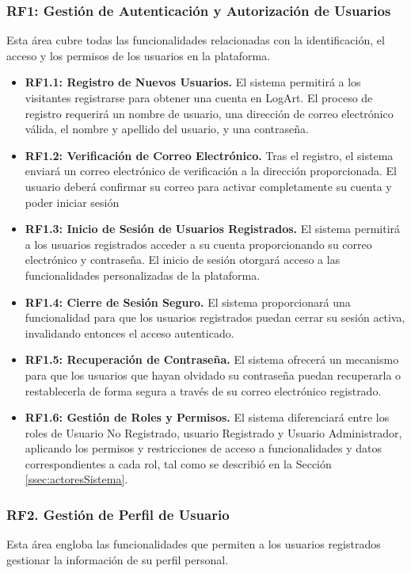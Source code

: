\subsubsection{RF1: Gestión de Autenticación y Autorización de Usuarios}
\label{rf:autenticacion}
Esta área cubre todas las funcionalidades relacionadas con la identificación, el acceso y los permisos de los usuarios en la plataforma.
\begin{itemize}
    \item \textbf{RF1.1: Registro de Nuevos Usuarios.} El sistema permitirá a los visitantes registrarse para obtener una cuenta en LogArt. El proceso de registro requerirá un nombre de usuario, una dirección de correo electrónico válida, el nombre y apellido del usuario, y una contraseña.
    \item \textbf{RF1.2: Verificación de Correo Electrónico.} Tras el registro, el sistema enviará un correo electrónico de verificación a la dirección proporcionada. El usuario deberá confirmar su correo para activar completamente su cuenta y poder iniciar sesión
    \item \textbf{RF1.3: Inicio de Sesión de Usuarios Registrados.} El sistema permitirá a los usuarios registrados acceder a su cuenta proporcionando su correo electrónico y contraseña. El inicio de sesión otorgará acceso a las funcionalidades personalizadas de la plataforma.
    \item \textbf{RF1.4: Cierre de Sesión Seguro.} El sistema proporcionará una funcionalidad para que los usuarios registrados puedan cerrar su sesión activa, invalidando entonces el acceso autenticado.
    \item \textbf{RF1.5: Recuperación de Contraseña.} El sistema ofrecerá un mecanismo para que los usuarios que hayan olvidado su contraseña puedan recuperarla o restablecerla de forma segura a través de su correo electrónico registrado.
    \item \textbf{RF1.6: Gestión de Roles y Permisos.} El sistema diferenciará entre los roles de Usuario No Registrado, usuario Registrado y Usuario Administrador, aplicando los permisos y restricciones de acceso a funcionalidades y datos correspondientes a cada rol, tal como se describió en la Sección \ref{ssec:actoresSistema}.
\end{itemize}

\subsubsection{RF2. Gestión de Perfil de Usuario}
\label{rf:perfilUsuario}
Esta área engloba las funcionalidades que permiten a los usuarios registrados gestionar la información de su perfil personal.

